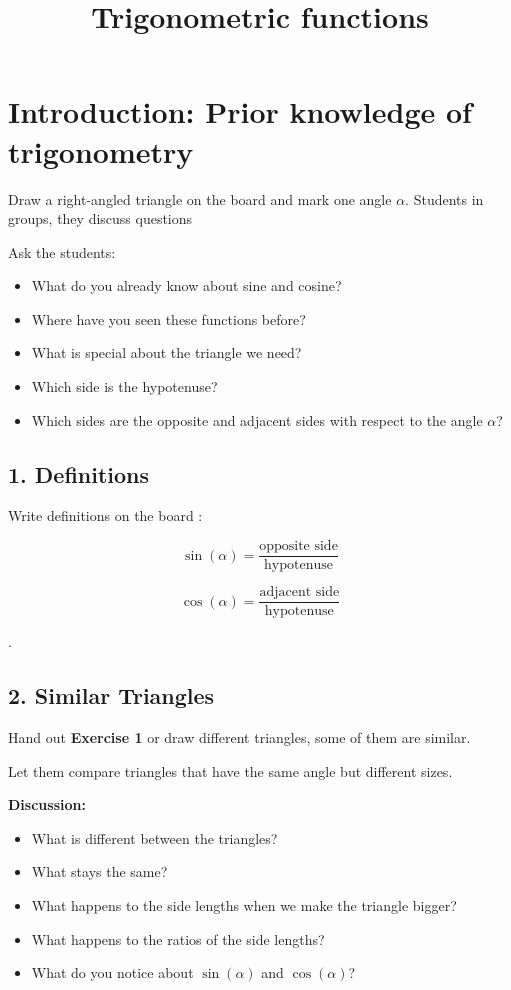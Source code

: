 \documentclass[a4paper,11pt]{article}
\title{Trigonometric functions}
\author{}
\date{}
\begin{document}
\maketitle

\section*{Introduction: Prior knowledge of trigonometry}

Draw a right-angled triangle on the board and mark one angle $\alpha$. Students in groups, they discuss questions

Ask the students:

\begin{itemize}
    \item What do you already know about sine and cosine?
    \item Where have you seen these functions before?
    \item What is special about the triangle we need?
    \item Which side is the hypotenuse?
    \item Which sides are the opposite and adjacent sides with respect to
    the angle $\alpha$?
\end{itemize}
\subsection*{1. Definitions}
Write definitions on the board :

\begin{equation}
    \sin(\alpha)
    =
    \frac{\text{opposite side}}{\text{hypotenuse}}
\end{equation}

\begin{equation}
    \cos(\alpha)
    =
    \frac{\text{adjacent side}}{\text{hypotenuse}}
\end{equation}

.


\subsection*{2. Similar Triangles}

Hand out \textbf{Exercise 1} or draw different triangles, some of them are similar. 

Let them compare triangles that have the same angle but different sizes.

\textbf{Discussion:}

\begin{itemize}
    \item What is different between the triangles?
    \item What stays the same?
    \item What happens to the side lengths when we make the triangle bigger?
    \item What happens to the ratios of the side lengths?
    \item What do you notice about $\sin(\alpha)$ and $\cos(\alpha)$?
\end{itemize}
\end{document}
